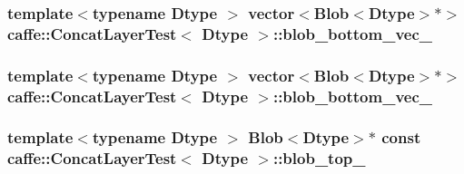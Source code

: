 \hypertarget{classcaffe_1_1_concat_layer_test_ad3d6992cf390bf791af61831658daaec}{
\subsubsection[{blob\+\_\+bottom\+\_\+vec\+\_\+0}]{\setlength{\rightskip}{0pt plus 5cm}template$<$typename Dtype $>$ vector$<${\bf Blob}$<$Dtype$>$$\ast$$>$ {\bf caffe\+::\+Concat\+Layer\+Test}$<$ Dtype $>$\+::blob\+\_\+bottom\+\_\+vec\+\_\hspace{0.3cm}{\ttfamily [protected]}}}\label{classcaffe_1_1_concat_layer_test_ad3d6992cf390bf791af61831658daaec}
\hypertarget{classcaffe_1_1_concat_layer_test_aa5a6e553646415c58ff0457c66d60a0d}{
\subsubsection[{blob\+\_\+bottom\+\_\+vec\+\_\+1}]{\setlength{\rightskip}{0pt plus 5cm}template$<$typename Dtype $>$ vector$<${\bf Blob}$<$Dtype$>$$\ast$$>$ {\bf caffe\+::\+Concat\+Layer\+Test}$<$ Dtype $>$\+::blob\+\_\+bottom\+\_\+vec\+\_\hspace{0.3cm}{\ttfamily [protected]}}}\label{classcaffe_1_1_concat_layer_test_aa5a6e553646415c58ff0457c66d60a0d}
\hypertarget{classcaffe_1_1_concat_layer_test_ab04bb1208c677cf82e91534a897dec55}{
\subsubsection[{blob\+\_\+top\+\_\+}]{\setlength{\rightskip}{0pt plus 5cm}template$<$typename Dtype $>$ {\bf Blob}$<$Dtype$>$$\ast$ const {\bf caffe\+::\+Concat\+Layer\+Test}$<$ Dtype $>$\+::blob\+\_\+top\+\_\+\hspace{0.3cm}{\ttfamily [protected]}}}\label{classcaffe_1_1_concat_layer_test_ab04bb1208c677cf82e91534a897dec55}
